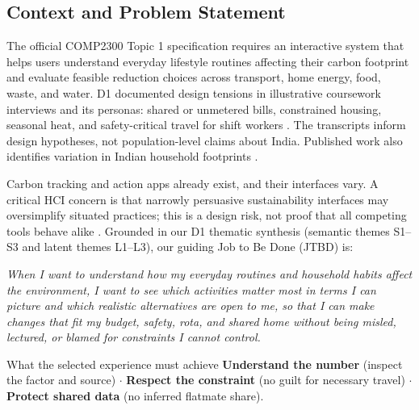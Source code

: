 \documentclass[12pt,a4paper]{article}
\begin{document}
\subsection{Context and Problem Statement}
The official COMP2300 Topic 1 specification requires an interactive system that helps users understand everyday lifestyle routines affecting their carbon footprint and evaluate feasible reduction choices across transport, home energy, food, waste, and water. D1 documented design tensions in illustrative coursework interviews and its personas: shared or unmetered bills, constrained housing, seasonal heat, and safety-critical travel for shift workers \cite{d1report}. The transcripts inform design hypotheses, not population-level claims about India. Published work also identifies variation in Indian household footprints \cite{lee2021}. 

Carbon tracking and action apps already exist, and their interfaces vary. A critical HCI concern is that narrowly persuasive sustainability interfaces may oversimplify situated practices; this is a design risk, not proof that all competing tools behave alike \cite{brynjarsdottir2012}. Grounded in our D1 thematic synthesis (semantic themes S1--S3 and latent themes L1--L3), our guiding Job to Be Done (JTBD) is:
\begin{jtbox}
\itshape
When I want to understand how my everyday routines and household habits affect the environment, I want to see which activities matter most in terms I can picture and which realistic alternatives are open to me, so that I can make changes that fit my budget, safety, rota, and shared home without being misled, lectured, or blamed for constraints I cannot control.
\end{jtbox}

\begin{chapterfocus}{What the selected experience must achieve}
\textbf{Understand the number} (inspect the factor and source) \quad $\cdot$ \quad
\textbf{Respect the constraint} (no guilt for necessary travel) \quad $\cdot$ \quad
\textbf{Protect shared data} (no inferred flatmate share).
\end{chapterfocus}
\end{document}
